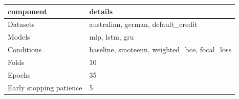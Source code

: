 \begin{tabular}{ll}
\toprule
component & details \\
\midrule
Datasets & australian, german, default_credit \\
Models & mlp, lstm, gru \\
Conditions & baseline, smoteenn, weighted_bce, focal_loss \\
Folds & 10 \\
Epochs & 35 \\
Early stopping patience & 5 \\
\bottomrule
\end{tabular}
